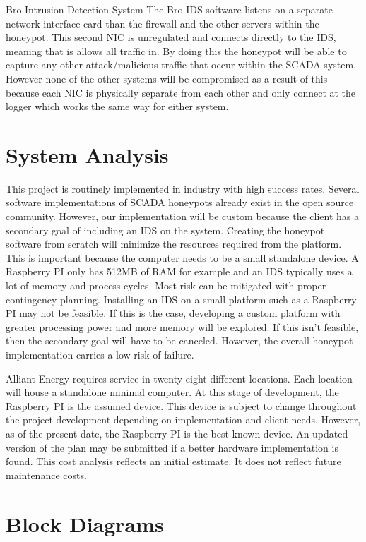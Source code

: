 \item Bro Intrusion Detection System
\newline
The Bro IDS software listens on a separate network interface card than the firewall and the other servers within the honeypot.  This second NIC is unregulated and connects directly to the IDS, meaning that is allows all traffic in.  By doing this the honeypot will be able to capture any other attack/malicious traffic that occur within the SCADA system.  However none of the other systems will be compromised as a result of this because each NIC is physically separate from each other and only connect at the logger which works the same way for either system.  

\section{System Analysis}
This project is routinely implemented in industry with high success rates. Several software implementations of SCADA honeypots already exist in the open source community. However, our implementation will be custom because the client has a secondary goal of including an IDS on the system. Creating the honeypot software from scratch will minimize the resources required from the platform. This is important because the computer needs to be a small standalone device. A Raspberry PI only has 512MB of RAM for example and an IDS typically uses a lot of memory and process cycles. Most risk can be mitigated with proper contingency planning. Installing an IDS on a small platform such as a Raspberry PI may not be feasible. If this is the case, developing a custom platform with greater processing power and more memory will be explored. If this isn't feasible, then the secondary goal will have to be canceled. However, the overall honeypot implementation carries a low risk of failure.

Alliant Energy requires service in twenty eight different locations. Each location will house a standalone minimal computer. At this stage of development, the Raspberry PI is the assumed device. This device is subject to change throughout the project development depending on implementation and client needs. However, as of the present date, the Raspberry PI is the best known device. An updated version of the plan may be submitted if a better hardware implementation is found. This cost analysis reflects an initial estimate. It does not reflect future maintenance costs.

\section{Block Diagrams}

\Blindtext

